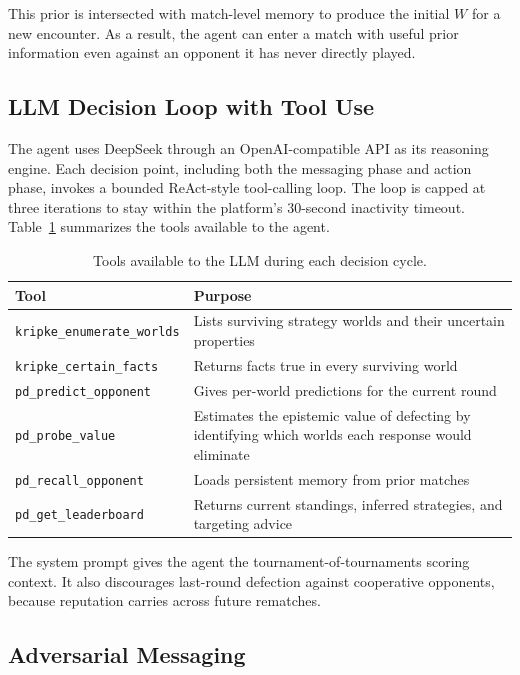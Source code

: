 \documentclass[11pt]{article}
\begin{document}
This prior is intersected with match-level memory to produce the initial $W$ for a new
encounter. As a result, the agent can enter a match with useful prior information even against
an opponent it has never directly played.

\subsection{LLM Decision Loop with Tool Use}

The agent uses DeepSeek through an OpenAI-compatible API as its reasoning engine. Each decision
point, including both the messaging phase and action phase, invokes a bounded ReAct-style
tool-calling loop. The loop is capped at three iterations to stay within the platform's
30-second inactivity timeout. Table~\ref{tab:tools} summarizes the tools available to the
agent.

\begin{table}[h]
\centering
\small
\begin{tabular}{@{}lp{7.5cm}@{}}
\toprule
Tool & Purpose \\
\midrule
\texttt{kripke\_enumerate\_worlds} & Lists surviving strategy worlds and their uncertain properties \\
\texttt{kripke\_certain\_facts}    & Returns facts true in every surviving world \\
\texttt{pd\_predict\_opponent}     & Gives per-world predictions for the current round \\
\texttt{pd\_probe\_value}          & Estimates the epistemic value of defecting by identifying which worlds each response would eliminate \\
\texttt{pd\_recall\_opponent}      & Loads persistent memory from prior matches \\
\texttt{pd\_get\_leaderboard}      & Returns current standings, inferred strategies, and targeting advice \\
\bottomrule
\end{tabular}
\caption{Tools available to the LLM during each decision cycle.}
\label{tab:tools}
\end{table}

The system prompt gives the agent the tournament-of-tournaments scoring context. It also
discourages last-round defection against cooperative opponents, because reputation carries
across future rematches.

\subsection{Adversarial Messaging}
\end{document}
